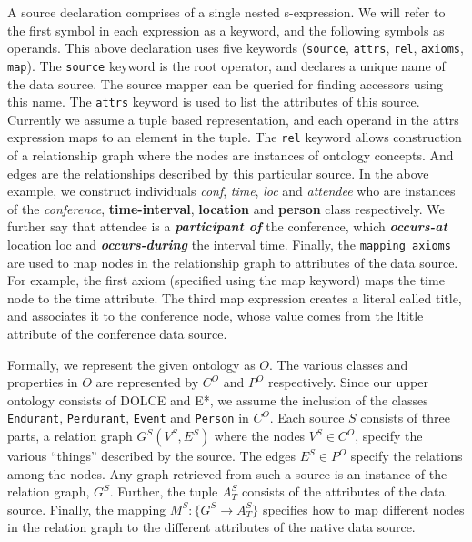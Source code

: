 A source declaration comprises of a single nested s-expression. We will refer to the first symbol in each expression as a keyword, and the following symbols as operands. This above declaration uses five keywords (\texttt{source}, \texttt{attrs}, \texttt{rel}, \texttt{axioms}, \texttt{map}).  The \texttt{source} keyword is the root operator, and declares a unique name of the data source. The source mapper can be queried for finding accessors using this name. The \texttt{attrs} keyword is used to list the attributes of this source. Currently we assume a tuple based representation, and each operand in the attrs expression maps to an element in the tuple. The \texttt{rel} keyword allows construction of a relationship graph where the nodes are instances of ontology concepts. And edges are the relationships described by this particular source. In the above example, we construct individuals \textit{conf}, \textit{time}, \textit{loc} and \textit{attendee} who are instances of the \textit{conference}, \textbf{time-interval}, \textbf{location} and \textbf{person} class respectively. We further say that attendee is a \textbf{\textit{participant of}} the conference, which \textbf{\textit{occurs-at}} location loc and \textbf{\textit{occurs-during}} the interval time. Finally, the \texttt{mapping axioms} are used to map nodes in the relationship graph to attributes of the data source. For example, the first axiom (specified using the map keyword) maps the time node to the time attribute. The third map expression creates a literal called title, and associates it to the conference node, whose value comes from the ltitle attribute of the conference data source.

Formally, we represent the given ontology as $O$. The various classes and properties in $O$ are represented by $C^O$ and $P^O$ respectively. Since our upper ontology consists of DOLCE and E*, we assume the inclusion of the classes \texttt{Endurant}, \texttt{Perdurant}, \texttt{Event} and \texttt{Person} in $C^O$. Each source $S$ consists of three parts, a relation graph $G^S(V^S, E^S)$ where the nodes $V^S \in C^O$, specify the various ``things'' described by the source. The edges $E^S \in P^O$ specify the relations among the nodes. Any graph retrieved from such a source is an instance of the relation graph, $G^S$. Further, the tuple $A^S_T$ consists of the attributes of the data source. Finally, the mapping $M^S: \{G^S \rightarrow A^S_T\}$ specifies how to map different nodes in the relation graph to the different attributes of the native data source.

